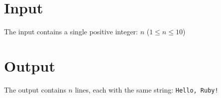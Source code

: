 
\section*{Input}

The input contains a single positive integer: $n$ ($1 \leqslant n \leqslant 10$)

\section*{Output}

The output contains $n$ lines, each with the same string: \texttt{Hello, Ruby!}

